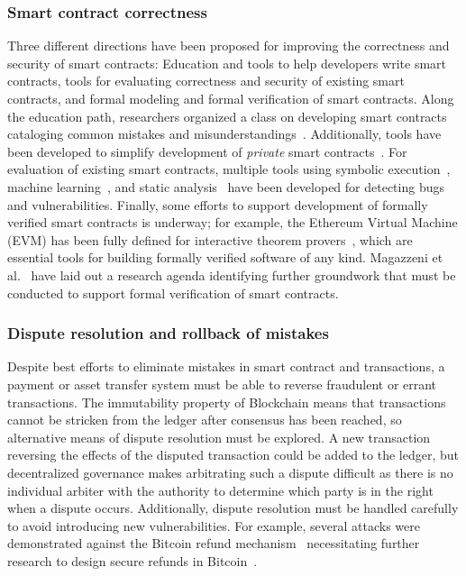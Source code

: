 \subsubsection{Smart contract correctness}
Three different directions have been proposed for improving the correctness and security of smart contracts:  Education and tools to help developers write smart contracts, tools for evaluating correctness and security of existing smart contracts, and formal modeling and formal verification of smart contracts. Along the education path, researchers organized a class on developing smart contracts cataloging common mistakes and misunderstandings~\cite{FC:DAKMS16}. Additionally, tools have been developed to simplify development of \emph{private} smart contracts~\cite{SP:KMSWP16}. For evaluation of existing smart contracts, multiple tools using symbolic execution~\cite{CCS:LCOSH16}, machine learning~\cite{arxiv:Huang18}, and static analysis~\cite{CCS:BDFGGK+16,NDSS:KGDS18} have been developed for detecting bugs and vulnerabilities. Finally, some efforts to support development of formally verified smart contracts is underway; for example, the Ethereum Virtual Machine (EVM) has been fully defined for interactive theorem provers~\cite{Hirai17}, which are essential tools for building formally verified software of any kind. Magazzeni et al.~\cite{Magazzeni17} have laid out a research agenda identifying further groundwork that must be conducted to support formal verification of smart contracts.

\subsubsection{Dispute resolution and rollback of mistakes}
Despite best efforts to eliminate mistakes in smart contract and transactions, a payment or asset transfer system must be able to reverse fraudulent or errant transactions. The immutability property of Blockchain means that transactions cannot be stricken from the ledger after consensus has been reached, so alternative means of dispute resolution must be explored. A new transaction reversing the effects of the disputed transaction could be added to the ledger, but decentralized governance makes arbitrating such a dispute difficult as there is no individual arbiter with the authority to determine which party is in the right when a dispute occurs.  Additionally, dispute resolution must be handled carefully to avoid introducing new vulnerabilities.  For example, several attacks were demonstrated against the Bitcoin refund mechanism~\cite{FC:MccShaHao16} necessitating further research to design secure refunds in Bitcoin~\cite{arxiv:AviSafSha18}.

